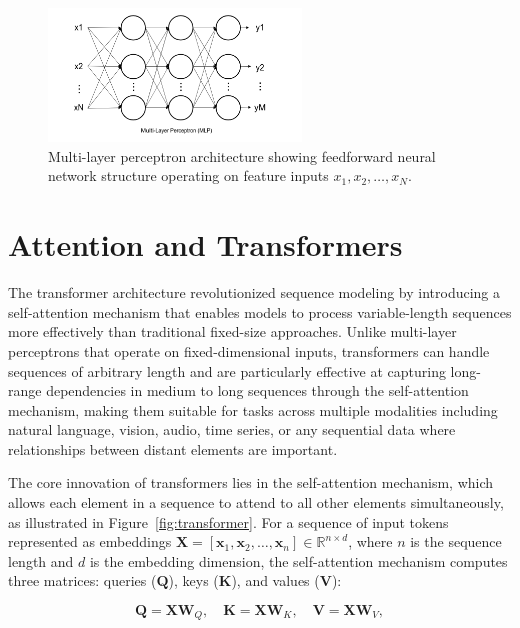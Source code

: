 \begin{figure}[htbp]
\centering
\includegraphics[width=0.6\textwidth]{Images/mlp.png}
\caption{Multi-layer perceptron architecture showing feedforward neural network structure operating on feature inputs $x_1, x_2, \ldots, x_N$.}
\label{fig:mlp}
\end{figure}

\section{Attention and Transformers}

The transformer architecture revolutionized sequence modeling by introducing a self-attention mechanism that enables models to process variable-length sequences more effectively than traditional fixed-size approaches. Unlike multi-layer perceptrons that operate on fixed-dimensional inputs, transformers can handle sequences of arbitrary length and are particularly effective at capturing long-range dependencies in medium to long sequences through the self-attention mechanism, making them suitable for tasks across multiple modalities including natural language, vision, audio, time series, or any sequential data where relationships between distant elements are important.

The core innovation of transformers lies in the self-attention mechanism, which allows each element in a sequence to attend to all other elements simultaneously, as illustrated in Figure~\ref{fig:transformer}. For a sequence of input tokens represented as embeddings $\mathbf{X} = [\mathbf{x}_1, \mathbf{x}_2, \ldots, \mathbf{x}_n] \in \mathbb{R}^{n \times d}$, where $n$ is the sequence length and $d$ is the embedding dimension, the self-attention mechanism computes three matrices: queries ($\mathbf{Q}$), keys ($\mathbf{K}$), and values ($\mathbf{V}$):

\begin{equation}
\mathbf{Q} = \mathbf{X}\mathbf{W}_Q, \quad \mathbf{K} = \mathbf{X}\mathbf{W}_K, \quad \mathbf{V} = \mathbf{X}\mathbf{W}_V,
\end{equation}

